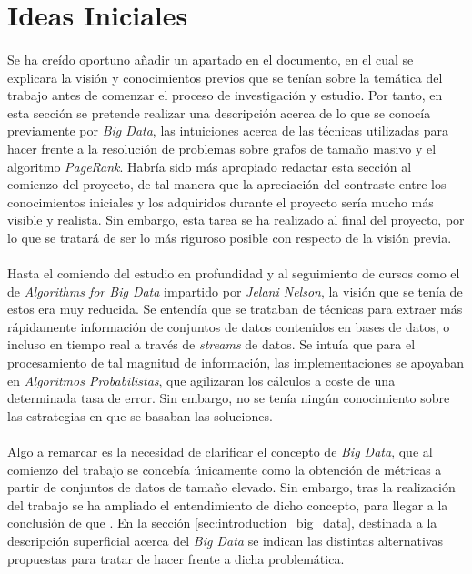 \documentclass{subfiles}
\begin{document}
    \section{Ideas Iniciales}
    \label{sec:introduction_initial_ideas}

      \paragraph{}
      Se ha creído oportuno añadir un apartado en el documento, en el cual se explicara la visión y conocimientos previos que se tenían sobre la temática del trabajo antes de comenzar el proceso de investigación y estudio. Por tanto, en esta sección se pretende realizar una descripción acerca de lo que se conocía previamente por \emph{Big Data}, las intuiciones acerca de las técnicas utilizadas para hacer frente a la resolución de problemas sobre grafos de tamaño masivo y el algoritmo \emph{PageRank}. Habría sido más apropiado redactar esta sección al comienzo del proyecto, de tal manera que la apreciación del contraste entre los conocimientos iniciales y los adquiridos durante el proyecto sería mucho más visible y realista. Sin embargo, esta tarea se ha realizado al final del proyecto, por lo que se tratará de ser lo más riguroso posible con respecto de la visión previa.

      \paragraph{}
      Hasta el comiendo del estudio en profundidad y al seguimiento de cursos como el de \emph{Algorithms for Big Data} \cite{bigdata2015jelani} impartido por \emph{Jelani Nelson}, la visión que se tenía de estos era muy reducida. Se entendía que se trataban de técnicas para extraer más rápidamente información de conjuntos de datos contenidos en bases de datos, o incluso en tiempo real a través de \emph{streams} de datos. Se intuía que para el procesamiento de tal magnitud de información, las implementaciones se apoyaban en \emph{Algoritmos Probabilistas}, que agilizaran los cálculos a coste de una determinada tasa de error. Sin embargo, no se tenía ningún conocimiento sobre las estrategias en que se basaban las soluciones.

      \paragraph{}
      Algo a remarcar es la necesidad de clarificar el concepto de \emph{Big Data}, que al comienzo del trabajo se concebía únicamente como la obtención de métricas a partir de conjuntos de datos de tamaño elevado. Sin embargo, tras la realización del trabajo se ha ampliado el entendimiento de dicho concepto, para llegar a la conclusión de que . En la sección \ref{sec:introduction_big_data}, destinada a la descripción superficial acerca del \emph{Big Data} se indican las distintas alternativas propuestas para tratar de hacer frente a dicha problemática.
\end{document}
